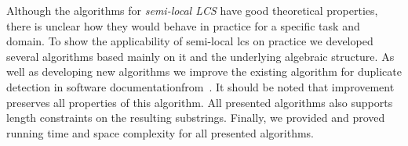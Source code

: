 Although the algorithms for \emph{semi-local LCS} have good theoretical properties, there is unclear how they would behave in practice for a specific task and domain.
To show the applicability of semi-local lcs on practice we developed several algorithms based mainly on it and the underlying algebraic structure.
As well as developing new algorithms we improve the existing algorithm for duplicate detection in software documentationfrom~\cite{luciv2019interactive}.
It should be noted that improvement preserves all properties of this algorithm.
All presented algorithms also supports length constraints on the resulting substrings.
Finally, we provided and proved running time and space complexity for all presented algorithms.


